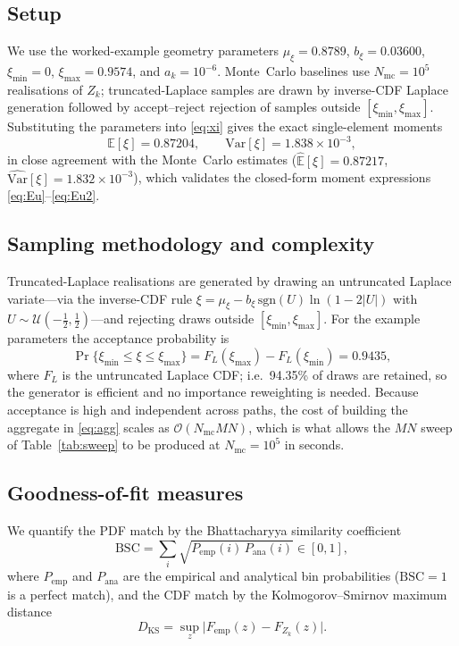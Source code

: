 \documentclass[conference]{IEEEtran}
\begin{document}
\subsection{Setup}
We use the worked-example geometry parameters
$\mu_\xi=0.8789$, $b_\xi=0.03600$, $\xi_{\min}=0$, $\xi_{\max}=0.9574$, and
$a_k=10^{-6}$. Monte~Carlo baselines use $N_{\mathrm{mc}}=10^{5}$
realisations of $Z_k$; truncated-Laplace samples are drawn by inverse-CDF
Laplace generation followed by accept--reject rejection of samples outside
$[\xi_{\min},\xi_{\max}]$. Substituting the parameters into
\eqref{eq:xi} gives the exact single-element moments
\begin{equation}
\mathbb{E}[\xi]=0.87204,\qquad \mathrm{Var}[\xi]=1.838\times10^{-3},
\end{equation}
in close agreement with the Monte~Carlo estimates
($\widehat{\mathbb{E}}[\xi]=0.87217$,
$\widehat{\mathrm{Var}}[\xi]=1.832\times10^{-3}$), which validates the
closed-form moment expressions \eqref{eq:Eu}--\eqref{eq:Eu2}.

\subsection{Sampling methodology and complexity}
Truncated-Laplace realisations are generated by drawing an untruncated
Laplace variate---via the inverse-CDF rule
$\xi=\mu_\xi-b_\xi\,\mathrm{sgn}(U)\ln(1-2|U|)$ with $U\!\sim\!
\mathcal{U}(-\tfrac12,\tfrac12)$---and rejecting draws outside
$[\xi_{\min},\xi_{\max}]$. For the example parameters the acceptance
probability is
\begin{equation}
\Pr\{\xi_{\min}\!\le\!\xi\!\le\!\xi_{\max}\}
=F_L(\xi_{\max})-F_L(\xi_{\min})=0.9435,
\end{equation}
where $F_L$ is the untruncated Laplace CDF; i.e.\ 94.35\% of
draws are retained, so the generator is efficient and no importance
reweighting is needed. Because acceptance is high and independent across
paths, the cost of building the aggregate in \eqref{eq:agg} scales as
$\mathcal{O}(N_{\mathrm{mc}}MN)$, which is what allows the $MN$ sweep of
Table~\ref{tab:sweep} to be produced at $N_{\mathrm{mc}}=10^{5}$ in
seconds.

\subsection{Goodness-of-fit measures}
We quantify the PDF match by the Bhattacharyya similarity coefficient
\begin{equation}
\mathrm{BSC}=\sum_{i}\sqrt{P_{\mathrm{emp}}(i)\,P_{\mathrm{ana}}(i)}
\in[0,1],
\end{equation}
where $P_{\mathrm{emp}}$ and $P_{\mathrm{ana}}$ are the empirical and
analytical bin probabilities ($\mathrm{BSC}=1$ is a perfect match), and the
CDF match by the Kolmogorov--Smirnov maximum distance
\begin{equation}
D_{\mathrm{KS}}=\sup_z\bigl|F_{\mathrm{emp}}(z)-F_{Z_k}(z)\bigr|.
\end{equation}
\end{document}
